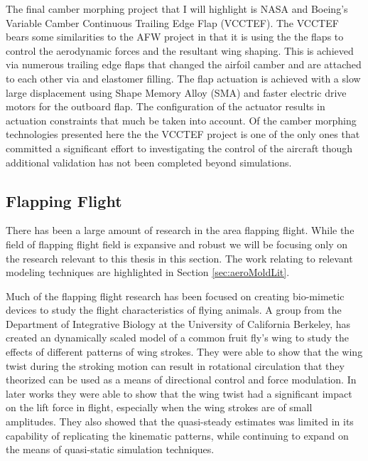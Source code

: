 \documentclass[11pt]{ucthesis}
\begin{document}
The final camber morphing project that I will highlight is NASA and Boeing's Variable Camber Continuous Trailing Edge Flap (VCCTEF). The VCCTEF bears some similarities to the AFW project in that it is using the the flaps to control the aerodynamic forces and the resultant wing shaping. This is achieved via numerous trailing edge flaps that changed the airfoil camber and are attached to each other via and elastomer filling. The flap actuation is achieved with a slow large displacement using Shape Memory Alloy (SMA) and faster electric drive motors for the outboard flap.\cite{urnes2013mission} The configuration of the actuator results in actuation constraints that much be taken into account. \cite{swei2014aeroelastic} Of the camber morphing technologies presented here the the VCCTEF project is one of the only ones that committed a significant effort to investigating the control of the aircraft\cite{nguyen2012aeroelastic} though additional validation has not been completed beyond simulations.

\subsection{Flapping Flight}
There has been a large amount of research in the area flapping flight. \cite{shyy2010recent} While the field of flapping flight field is expansive and robust we will be focusing only on the research relevant to this thesis in this section. The work relating to relevant modeling techniques are highlighted in Section \ref{sec:aeroMoldLit}. 

Much of the flapping flight research has been focused on creating bio-mimetic devices to study the flight characteristics of flying animals. A group from the Department of Integrative Biology at the University of California Berkeley, has created an dynamically scaled model of a common fruit fly's wing to study the effects of different patterns of wing strokes. They were able to show that the wing twist during the stroking motion can result in rotational circulation that they theorized can be used as a means of directional control and force modulation.\cite{dickinson1999wing} In later works they were able to show that the wing twist had a significant impact on the lift force in flight, especially when the wing strokes are of small amplitudes. They also showed that the quasi-steady estimates was limited in its capability of replicating the kinematic patterns,\cite{sane2001control} while continuing to expand on the means of quasi-static simulation techniques.\cite{sane2002aerodynamic}
\end{document}
